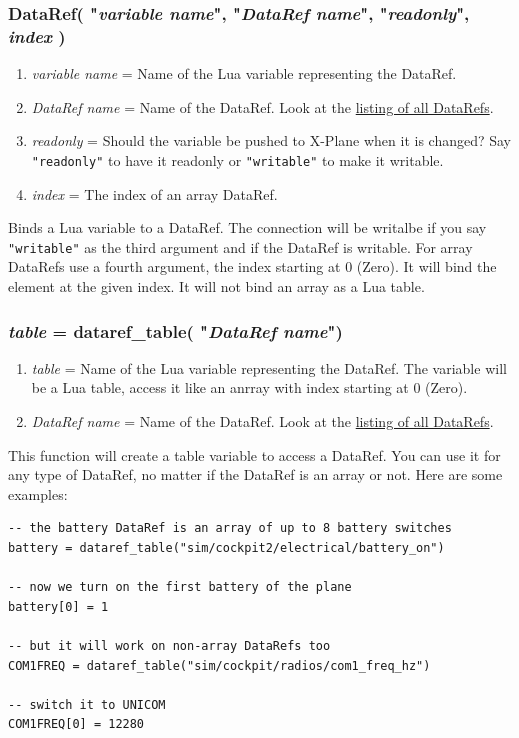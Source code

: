 \documentclass[11pt,parskip=half,a4paper]{scrartcl}
\begin{document}
\subsubsection{DataRef( "\emph{variable name}", "\emph{DataRef name}", "\emph{readonly}", \emph{index} )}

\begin{enumerate}
	\item \emph{variable name} = Name of the Lua variable representing the DataRef.
	\item \emph{DataRef name} = Name of the DataRef. Look at the \href{http://www.xsquawkbox.net/xpsdk/docs/DataRefs.html}{listing of all DataRefs}.
	\item \emph{readonly} = Should the variable be pushed to X-Plane when it is changed? Say \verb|"readonly"| to have it readonly or \verb|"writable"| to make it writable.
	\item \emph{index} = The index of an array DataRef.
\end{enumerate}

Binds a Lua variable to a DataRef. The connection will be writalbe if you say \verb|"writable"| as the third argument and if the DataRef is writable. For array DataRefs use a fourth argument, the index starting at 0 (Zero). It will bind the element at the given index. It will not bind an array as a Lua table.


\subsubsection{\emph{table} = dataref\_table( "\emph{DataRef name}")}

\begin{enumerate}
	\item \emph{table} = Name of the Lua variable representing the DataRef. The variable will be a Lua table, access it like an anrray with index starting at 0 (Zero). 
	\item \emph{DataRef name} = Name of the DataRef. Look at the \href{http://www.xsquawkbox.net/xpsdk/docs/DataRefs.html}{listing of all DataRefs}.
\end{enumerate}

This function will create a table variable to access a DataRef. You can use it for any type of DataRef, no matter if the DataRef is an array or not. Here are some examples:

\begin{lstlisting}
-- the battery DataRef is an array of up to 8 battery switches
battery = dataref_table("sim/cockpit2/electrical/battery_on")

-- now we turn on the first battery of the plane
battery[0] = 1

-- but it will work on non-array DataRefs too
COM1FREQ = dataref_table("sim/cockpit/radios/com1_freq_hz")

-- switch it to UNICOM
COM1FREQ[0] = 12280
\end{lstlisting}
\end{document}
